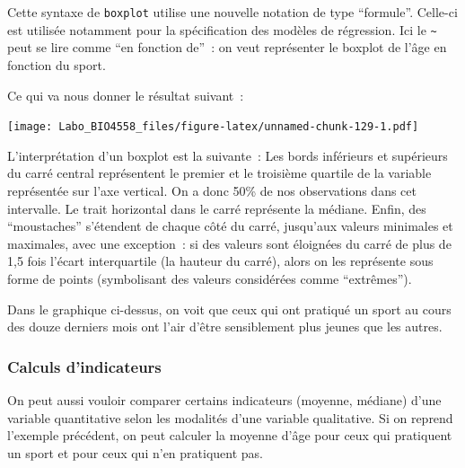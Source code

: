\documentclass[12pt,]{book}
\makeatletter
\newenvironment{Shaded}{\begin{snugshade}}{\end{snugshade}}
\newcommand{\KeywordTok}[1]{\textcolor[rgb]{0.27,0.27,0.27}{\textbf{#1}}}
\newcommand{\NormalTok}[1]{#1}
\newcommand{\OperatorTok}[1]{\textcolor[rgb]{0.43,0.43,0.43}{\textbf{#1}}}
\newcommand{\StringTok}[1]{\textcolor[rgb]{0.5,0.5,0.5}{#1}}
\newenvironment{kframe}{%
\medskip{}
\setlength{\fboxsep}{.8em}
 \def\at@end@of@kframe{}%
 \ifinner\ifhmode%
  \def\at@end@of@kframe{\end{minipage}}%
  \begin{minipage}{\columnwidth}%
 \fi\fi%
 \def\FrameCommand##1{\hskip\@totalleftmargin \hskip-\fboxsep
 \colorbox{shadecolor}{##1}\hskip-\fboxsep
     \hskip-\linewidth \hskip-\@totalleftmargin \hskip\columnwidth}%
 \MakeFramed {\advance\hsize-\width
   \@totalleftmargin\z@ \linewidth\hsize
   \@setminipage}}%
 {\par\unskip\endMakeFramed%
 \at@end@of@kframe}
\newenvironment{rmdblock}[1]
  {
  \begin{itemize}
  \renewcommand{\labelitemi}{
    \raisebox{-.7\height}[0pt][0pt]{
      {\setkeys{Gin}{width=3em,keepaspectratio}\texttt{[image: images/\#1]}}
    }
  }
  \setlength{\fboxsep}{1em}
  \begin{kframe}
  \item
  }
  {
  \end{kframe}
  \end{itemize}
  }
\newenvironment{rmdnote}
  {\begin{rmdblock}{note}}
  {\end{rmdblock}}
\makeatother
\begin{document}
\begin{Shaded}
\end{Shaded}

\begin{rmdnote}
Cette syntaxe de \texttt{boxplot} utilise une nouvelle notation de type
``formule''. Celle-ci est utilisée notamment pour la spécification des
modèles de régression. Ici le \texttt{\textasciitilde{}} peut se lire
comme ``en fonction de''~: on veut représenter le boxplot de l'âge en
fonction du sport.
\end{rmdnote}

Ce qui va nous donner le résultat suivant~:

\texttt{[image: Labo\_BIO4558\_files/figure-latex/unnamed-chunk-129-1.pdf]}

\begin{rmdnote}
L'interprétation d'un boxplot est la suivante~: Les bords inférieurs et
supérieurs du carré central représentent le premier et le troisième
quartile de la variable représentée sur l'axe vertical. On a donc 50\%
de nos observations dans cet intervalle. Le trait horizontal dans le
carré représente la médiane. Enfin, des ``moustaches'' s'étendent de
chaque côté du carré, jusqu'aux valeurs minimales et maximales, avec une
exception~: si des valeurs sont éloignées du carré de plus de 1,5 fois
l'écart interquartile (la hauteur du carré), alors on les représente
sous forme de points (symbolisant des valeurs considérées comme
``extrêmes'').
\end{rmdnote}

Dans le graphique ci-dessus, on voit que ceux qui ont pratiqué un sport au cours des douze derniers mois ont l'air d'être sensiblement plus jeunes que les autres.

\hypertarget{calculs-dindicateurs}{%
\subsubsection{Calculs d'indicateurs}\label{calculs-dindicateurs}}

On peut aussi vouloir comparer certains indicateurs (moyenne, médiane) d'une variable quantitative selon les modalités d'une variable qualitative. Si on reprend l'exemple précédent, on peut calculer la moyenne d'âge pour ceux qui pratiquent un sport et pour ceux qui n'en pratiquent pas.
\end{document}
